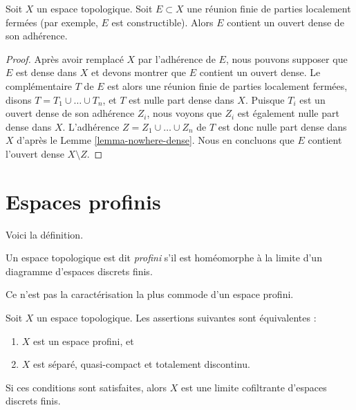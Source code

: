 \begin{lemma}
\label{lemma-dense-in-constructible}
Soit $X$ un espace topologique. Soit $E \subset X$ une réunion finie de
parties localement fermées (par exemple, $E$ est constructible). Alors $E$
contient un ouvert dense de son adhérence.
\end{lemma}

\begin{proof}
Après avoir remplacé $X$ par l'adhérence de $E$, nous pouvons supposer que
$E$ est dense dans $X$ et devons montrer que $E$ contient un ouvert dense.
Le complémentaire $T$ de $E$ est alors une réunion finie de parties localement
fermées, disons $T = T_1 \cup \ldots \cup T_n$, et $T$ est nulle part dense
dans $X$. Puisque $T_i$ est un ouvert dense de son adhérence $Z_i$, nous voyons
que $Z_i$ est également nulle part dense dans $X$. L'adhérence
$Z = Z_1 \cup \ldots \cup Z_n$ de $T$ est donc nulle part dense dans $X$
d'après le Lemme \ref{lemma-nowhere-dense}.
Nous en concluons que $E$ contient l'ouvert dense $X \setminus Z$.
\end{proof}





\section{Espaces profinis}
\label{section-profinite}

\noindent
Voici la définition.

\begin{definition}
\label{definition-profinite}
Un espace topologique est dit {\it profini} s'il est homéomorphe à la limite
d'un diagramme d'espaces discrets finis.
\end{definition}

\noindent
Ce n'est pas la caractérisation la plus commode d'un espace profini.

\begin{lemma}
\label{lemma-profinite}
Soit $X$ un espace topologique.
Les assertions suivantes sont équivalentes :
\begin{enumerate}
\item $X$ est un espace profini, et
\item $X$ est séparé, quasi-compact et totalement discontinu.
\end{enumerate}
Si ces conditions sont satisfaites, alors $X$ est une limite cofiltrante
d'espaces discrets finis.
\end{lemma}

